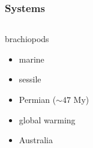 \documentclass{beamer}
\begin{document}
\begin{frame}
  \frametitle{Systems}

  \begin{columns}
    \begin{column}{0.5\textwidth}
      \begin{block}{brachiopods}
        \begin{itemize}
          \item marine
          \item sessile
          \item Permian (\(\sim 47\) My)
          \item global warming
          \item Australia
        \end{itemize}
      \end{block}


\end{column}
\end{columns}
\end{frame}
\end{document}

